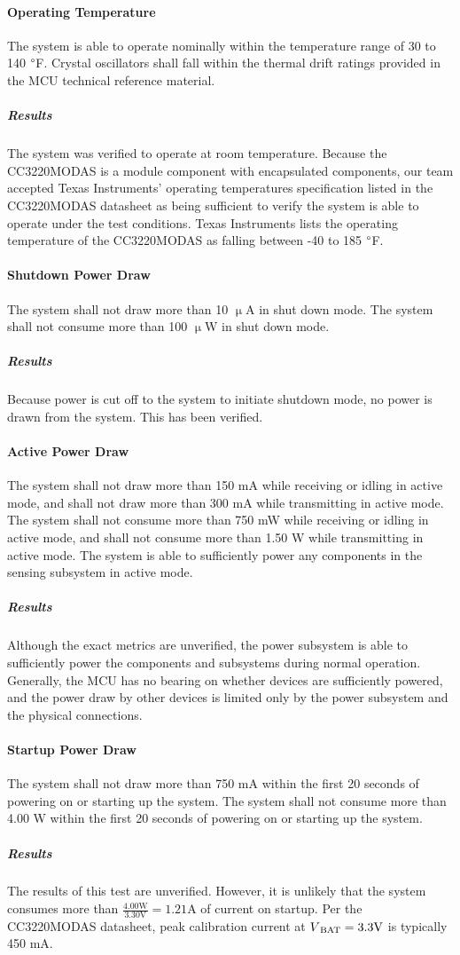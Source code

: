 \paragraph{Operating Temperature} The system is able to operate
nominally within the temperature range of 30 to 140 $\degree$F. Crystal
oscillators shall fall within the thermal drift ratings provided in the
MCU technical reference material.
\subparagraph{Results} The system was verified to operate at room temperature. Because the CC3220MODAS is a module component with encapsulated components, our team accepted Texas Instruments' operating temperatures specification listed in the CC3220MODAS datasheet as being sufficient to verify the system is able to operate under the test conditions. Texas Instruments lists the operating temperature of the CC3220MODAS as falling between -40 to 185 $\degree$F.

\paragraph{Shutdown Power Draw} The system shall not draw more than 10
$\upmu$A in shut down mode. The system shall not consume more than 100
$\upmu$W in shut down mode.
\subparagraph{Results} Because power is cut off to the system to initiate shutdown mode, no power is drawn from the system. This has been verified.

\paragraph{Active Power Draw} The system shall not draw more than 150 mA while
receiving or idling in active mode, and shall not draw more than 300
mA while transmitting in active mode. The system shall not consume more
than 750 mW while receiving or idling in active mode, and shall not
consume more than 1.50 W while transmitting in active mode. The system
is able to sufficiently power any components in the sensing subsystem in
active mode.
\subparagraph{Results} Although the exact metrics are unverified, the power subsystem is able to sufficiently power the components and subsystems during normal operation. Generally, the MCU has no bearing on whether devices are sufficiently powered, and the power draw by other devices is limited only by the power subsystem and the physical connections.

\paragraph{Startup Power Draw} The system shall not draw more than 750 mA
within the first 20 seconds of powering on or starting up the system. The
system shall not consume more than 4.00 W within the first 20 seconds of
powering on or starting up the system.
\subparagraph{Results} The results of this test are unverified. However, it is unlikely that the system consumes more than $\frac{4.00 \mathrm{W}}{3.30 \mathrm{V}} = 1.21 \mathrm{A}$ of current on startup. Per the CC3220MODAS datasheet, peak calibration current at $V\textsubscript{BAT} = 3.3 \mathrm{V}$ is typically 450 mA.

